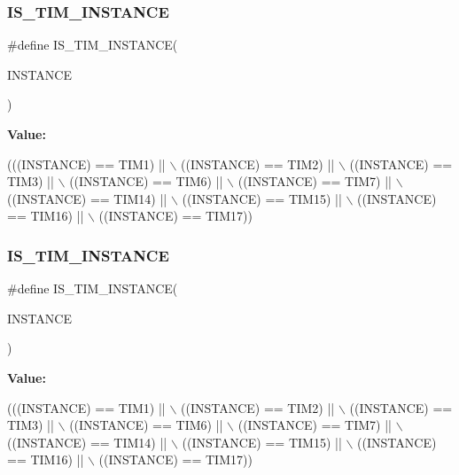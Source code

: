 \subsubsection{\texorpdfstring{I\+S\+\_\+\+T\+I\+M\+\_\+\+I\+N\+S\+T\+A\+N\+CE}{IS\_TIM\_INSTANCE}\hspace{0.1cm}{\footnotesize\ttfamily [13/16]}}
{\footnotesize\ttfamily \#define I\+S\+\_\+\+T\+I\+M\+\_\+\+I\+N\+S\+T\+A\+N\+CE(\begin{DoxyParamCaption}\item[{}]{I\+N\+S\+T\+A\+N\+CE }\end{DoxyParamCaption})}

{\bfseries Value\+:}
\begin{DoxyCode}
(((INSTANCE) == TIM1)    || \(\backslash\)
   ((INSTANCE) == TIM2)    || \(\backslash\)
   ((INSTANCE) == TIM3)    || \(\backslash\)
   ((INSTANCE) == TIM6)    || \(\backslash\)
   ((INSTANCE) == TIM7)    || \(\backslash\)
   ((INSTANCE) == TIM14)   || \(\backslash\)
   ((INSTANCE) == TIM15)   || \(\backslash\)
   ((INSTANCE) == TIM16)   || \(\backslash\)
   ((INSTANCE) == TIM17))
\end{DoxyCode}
\mbox{\label{group___exported__macro_gaba506eb03409b21388d7c5a6401a4f98}} 
\subsubsection{\texorpdfstring{I\+S\+\_\+\+T\+I\+M\+\_\+\+I\+N\+S\+T\+A\+N\+CE}{IS\_TIM\_INSTANCE}\hspace{0.1cm}{\footnotesize\ttfamily [14/16]}}
{\footnotesize\ttfamily \#define I\+S\+\_\+\+T\+I\+M\+\_\+\+I\+N\+S\+T\+A\+N\+CE(\begin{DoxyParamCaption}\item[{}]{I\+N\+S\+T\+A\+N\+CE }\end{DoxyParamCaption})}

{\bfseries Value\+:}
\begin{DoxyCode}
(((INSTANCE) == TIM1)    || \(\backslash\)
   ((INSTANCE) == TIM2)    || \(\backslash\)
   ((INSTANCE) == TIM3)    || \(\backslash\)
   ((INSTANCE) == TIM6)    || \(\backslash\)
   ((INSTANCE) == TIM7)    || \(\backslash\)
   ((INSTANCE) == TIM14)   || \(\backslash\)
   ((INSTANCE) == TIM15)   || \(\backslash\)
   ((INSTANCE) == TIM16)   || \(\backslash\)
   ((INSTANCE) == TIM17))
\end{DoxyCode}
\mbox{\label{group___exported__macro_gaba506eb03409b21388d7c5a6401a4f98}} 
